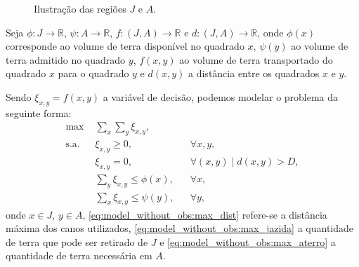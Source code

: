 \begin{figure}[!htb]
    \centering
    \caption{Ilustra\c{c}\~{a}o das regiões $J$ e $A$.}
    \label{fig:disc_J_A_aprox}
\end{figure}

Seja $\phi : J \to \mathbb{R}$, $\psi: A \to \mathbb{R}$, $f: (J, A) \to
\mathbb{R}$ e $d: (J, A) \to \mathbb{R}$, onde $\phi(x)$ corresponde ao volume
de terra disponível no quadrado $x$, $\psi(y)$ ao volume de terra admitido no
quadrado $y$, $f(x, y)$ ao volume de terra transportado do quadrado $x$ para o
quadrado $y$ e $d(x, y)$ a distância entre os quadrados $x$ e $y$.

Sendo $\xi_{x, y} = f(x, y)$ a variável de decisão, podemos modelar o problema
da seguinte forma:
\begin{subequations}
    \begin{align}
        \text{max } & \sum_{x} \sum_{y} \xi_{x, y},
        \label{eq:model_without_obs:obj_func} \\
        \text{s.a. } & \xi_{x, y} \geq 0, && \forall x, y,
        \label{eq:model_without_obs:var} \\
        & \xi_{x, y} = 0, && \forall (x, y) \mid d(x, y) > D,
        \label{eq:model_without_obs:max_dist} \\
        & \sum_{y} \xi_{x, y} \leq \phi(x), && \forall x,
        \label{eq:model_without_obs:max_jazida} \\
        & \sum_{x} \xi_{x, y} \leq \psi(y), && \forall y,
        \label{eq:model_without_obs:max_aterro}
    \end{align}
    \label{eq:model_without_obs}
\end{subequations}
onde $x \in J$, $y \in A$, \eqref{eq:model_without_obs:max_dist} refere-se a
distância máxima dos canos utilizados, \eqref{eq:model_without_obs:max_jazida} a
quantidade de terra que pode ser retirado de $J$ e
\eqref{eq:model_without_obs:max_aterro} a quantidade de terra necessária em $A$.

